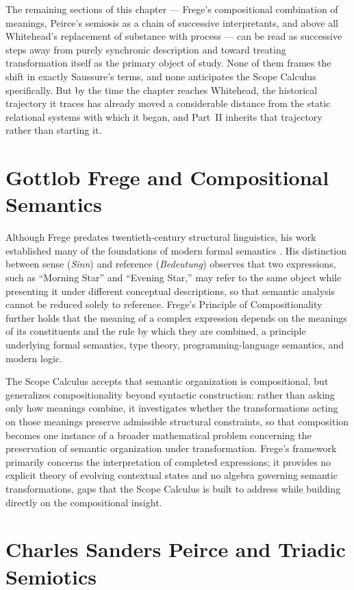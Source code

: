 \documentclass[11pt,twoside,openright]{book}
\numberwithin{equation}{chapter}
\theoremstyle{definition}
\theoremstyle{plain}
\theoremstyle{remark}
\theoremstyle{definition}
\begin{document}
The remaining sections of this chapter --- Frege's compositional
combination of meanings, Peirce's semiosis as a chain of successive
interpretants, and above all Whitehead's replacement of substance with
process --- can be read as successive steps away from purely synchronic
description and toward treating transformation itself as the primary
object of study. None of them frames the shift in exactly Saussure's
terms, and none anticipates the Scope Calculus specifically. But by the
time the chapter reaches Whitehead, the historical trajectory it traces
has already moved a considerable distance from the static relational
systems with which it began, and Part~II inherits that trajectory rather
than starting it.

\section{Gottlob Frege and Compositional Semantics}

Although Frege predates twentieth-century structural linguistics, his
work established many of the foundations of modern formal semantics
\cite{Frege1892}. His distinction between sense (\emph{Sinn}) and
reference (\emph{Bedeutung}) observes that two expressions, such as
``Morning Star'' and ``Evening Star,'' may refer to the same object while
presenting it under different conceptual descriptions, so that semantic
analysis cannot be reduced solely to reference. Frege's Principle of
Compositionality further holds that the meaning of a complex expression
depends on the meanings of its constituents and the rule by which they
are combined, a principle underlying formal semantics, type theory,
programming-language semantics, and modern logic.

The Scope Calculus accepts that semantic organization is compositional,
but generalizes compositionality beyond syntactic construction: rather
than asking only how meanings combine, it investigates whether the
transformations acting on those meanings preserve admissible structural
constraints, so that composition becomes one instance of a broader
mathematical problem concerning the preservation of semantic organization
under transformation. Frege's framework primarily concerns the
interpretation of completed expressions; it provides no explicit theory
of evolving contextual states and no algebra governing semantic
transformations, gaps that the Scope Calculus is built to address while
building directly on the compositional insight.

\section{Charles Sanders Peirce and Triadic Semiotics}
\end{document}
